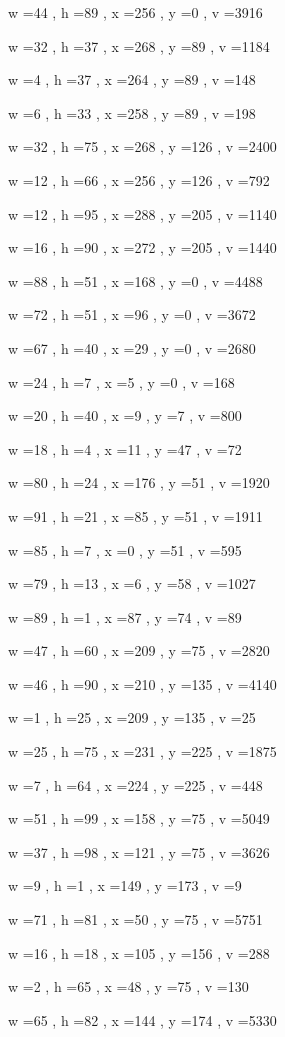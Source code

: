 \documentclass[11pt]{article}
\begin{document}
w =44 , h =89 , x =256 , y =0 , v =3916
\par
w =32 , h =37 , x =268 , y =89 , v =1184
\par
w =4 , h =37 , x =264 , y =89 , v =148
\par
w =6 , h =33 , x =258 , y =89 , v =198
\par
w =32 , h =75 , x =268 , y =126 , v =2400
\par
w =12 , h =66 , x =256 , y =126 , v =792
\par
w =12 , h =95 , x =288 , y =205 , v =1140
\par
w =16 , h =90 , x =272 , y =205 , v =1440
\par
w =88 , h =51 , x =168 , y =0 , v =4488
\par
w =72 , h =51 , x =96 , y =0 , v =3672
\par
w =67 , h =40 , x =29 , y =0 , v =2680
\par
w =24 , h =7 , x =5 , y =0 , v =168
\par
w =20 , h =40 , x =9 , y =7 , v =800
\par
w =18 , h =4 , x =11 , y =47 , v =72
\par
w =80 , h =24 , x =176 , y =51 , v =1920
\par
w =91 , h =21 , x =85 , y =51 , v =1911
\par
w =85 , h =7 , x =0 , y =51 , v =595
\par
w =79 , h =13 , x =6 , y =58 , v =1027
\par
w =89 , h =1 , x =87 , y =74 , v =89
\par
w =47 , h =60 , x =209 , y =75 , v =2820
\par
w =46 , h =90 , x =210 , y =135 , v =4140
\par
w =1 , h =25 , x =209 , y =135 , v =25
\par
w =25 , h =75 , x =231 , y =225 , v =1875
\par
w =7 , h =64 , x =224 , y =225 , v =448
\par
w =51 , h =99 , x =158 , y =75 , v =5049
\par
w =37 , h =98 , x =121 , y =75 , v =3626
\par
w =9 , h =1 , x =149 , y =173 , v =9
\par
w =71 , h =81 , x =50 , y =75 , v =5751
\par
w =16 , h =18 , x =105 , y =156 , v =288
\par
w =2 , h =65 , x =48 , y =75 , v =130
\par
w =65 , h =82 , x =144 , y =174 , v =5330
\par
\end{document}
